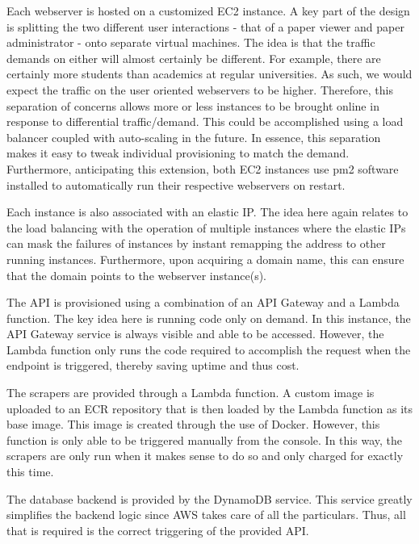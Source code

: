\documentclass[12pt]{article}
\begin{document}
Each webserver is hosted on a customized EC2 instance. A key part of the design is splitting the two different user interactions - that of a paper viewer and paper administrator - onto separate virtual machines. The idea is that the traffic demands on either will almost certainly be different. For example, there are certainly more students than academics at regular universities. As such, we would expect the traffic on the user oriented webservers to be higher. Therefore, this separation of concerns allows more or less instances to be brought online in response to differential traffic/demand. This could be accomplished using a load balancer coupled with auto-scaling in the future. In essence, this separation makes it easy to tweak individual provisioning to match the demand. 
Furthermore, anticipating this extension, both EC2 instances use pm2 software installed to automatically run their respective webservers on restart. 

Each instance is also associated with an elastic IP. The idea here again relates to the load balancing with the operation of multiple instances where the elastic IPs can mask the failures of instances by instant remapping the address to other running instances. Furthermore, upon acquiring a domain name, this can ensure that the domain points to the webserver instance(s).

The API is provisioned using a combination of an API Gateway and a Lambda function. The key idea here is running code only on demand. In this instance, the API Gateway service is always visible and able to be accessed. However, the Lambda function only runs the code required to accomplish the request when the endpoint is triggered, thereby saving uptime and thus cost.   

The scrapers are provided through a Lambda function. A custom image is uploaded to an ECR repository that is then loaded by the Lambda function as its base image. This image is created through the use of Docker. However, this function is only able to be triggered manually from the console. In this way, the scrapers are only run when it makes sense to do so and only charged for exactly this time.

The database backend is provided by the DynamoDB service. This service greatly simplifies the backend logic since AWS takes care of all the particulars. Thus, all that is required is the correct triggering of the provided API. 

\pagebreak
\end{document}
